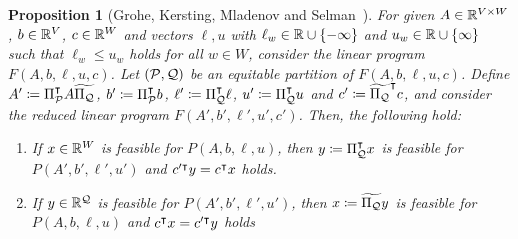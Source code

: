 \documentclass[pdflatex,sn-mathphys-num]{sn-jnl}%
\theoremstyle{thmstyleone}%
\newtheorem{proposition}[proposition]{Proposition}
\theoremstyle{thmstylethree}%
\theoremstyle{thmstyletwo}%
\begin{document}
\begin{proposition}[Grohe, Kersting, Mladenov and Selman~\cite{Grohe2014}
]
    \label{thm_lp_folding}
    For given $A\in \mathbb{R}^{V\times W}$, $b\in \mathbb{R}^{V}$, $c\in \mathbb{R}^{W}$ and vectors $\ell, u$ with $\ell_w \in \mathbb{R} \cup \{-\infty\}$ and $u_w\in \mathbb{R} \cup \{\infty\} $ such that $\ell_w \leq u_w$ holds for all $w\in W$, consider the linear program $F(A,b,\ell, u, c)$. Let $(\mathcal{P},\mathcal{Q})$ be an equitable partition of $F(A,b,\ell,u,c)$.  Define 
    $A' \coloneqq \transpose{\Pi_{\MP}} A \widetilde{\Pi_{\MQ}}$, $b'\coloneqq \transpose{\Pi_{\MP}} b$, $\ell' \coloneqq \transpose{\Pi_{\MQ}} \ell$, $u' \coloneqq \transpose{\Pi_\MQ} u$ and $c' \coloneqq  \transpose{\widetilde{\Pi_\MQ}} c$, and consider the reduced linear program $F(A',b',\ell',u',c')$. Then, the following hold:
    \begin{enumerate}[label=(\roman*)]
        \item \label{thm_lp_folding_to_red} If $x\in \mathbb{R}^W$ is feasible for $P(A,b,\ell, u)$, then $y \coloneqq \transpose{\Pi_{\MQ}} x$ is feasible for $P(A',b',\ell', u')$ and $c'^{\intercal}y = c^{\intercal} x$ holds.
        \item \label{thm_lp_folding_from_red} If $y\in \mathbb{R}^{\mathcal{Q}}$ is feasible for $P(A',b',\ell', u')$, then $x \coloneqq \widetilde{\Pi_{\MQ}} y$ is feasible for $P(A,b,\ell,u)$ and $c^{\intercal} x = c'^{\intercal} y$ holds
    \end{enumerate}
\end{proposition}
\end{document}

